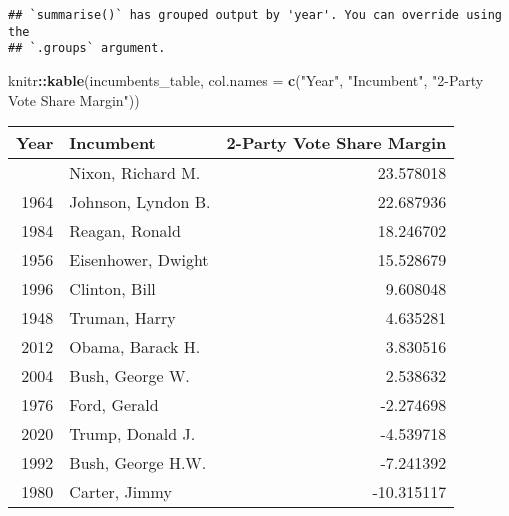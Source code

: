 \documentclass[
]{article}
\newenvironment{Shaded}{\begin{snugshade}}{\end{snugshade}}
\newcommand{\AttributeTok}[1]{\textcolor[rgb]{0.13,0.29,0.53}{#1}}
\newcommand{\FunctionTok}[1]{\textcolor[rgb]{0.13,0.29,0.53}{\textbf{#1}}}
\newcommand{\NormalTok}[1]{#1}
\newcommand{\SpecialCharTok}[1]{\textcolor[rgb]{0.81,0.36,0.00}{\textbf{#1}}}
\newcommand{\StringTok}[1]{\textcolor[rgb]{0.31,0.60,0.02}{#1}}
\begin{document}
\begin{verbatim}
## `summarise()` has grouped output by 'year'. You can override using the
## `.groups` argument.
\end{verbatim}

\begin{Shaded}
\begin{Highlighting}[]
\NormalTok{knitr}\SpecialCharTok{::}\FunctionTok{kable}\NormalTok{(incumbents\_table, }\AttributeTok{col.names =} \FunctionTok{c}\NormalTok{(}\StringTok{"Year"}\NormalTok{, }\StringTok{"Incumbent"}\NormalTok{, }\StringTok{"2{-}Party Vote Share Margin"}\NormalTok{))}
\end{Highlighting}
\end{Shaded}

\begin{longtable}[]{@{}rlr@{}}
\toprule\noalign{}
Year & Incumbent & 2-Party Vote Share Margin \\
\midrule\noalign{}
\endhead
\bottomrule\noalign{}
\endlastfoot
1972 & Nixon, Richard M. & 23.578018 \\
1964 & Johnson, Lyndon B. & 22.687936 \\
1984 & Reagan, Ronald & 18.246702 \\
1956 & Eisenhower, Dwight & 15.528679 \\
1996 & Clinton, Bill & 9.608048 \\
1948 & Truman, Harry & 4.635281 \\
2012 & Obama, Barack H. & 3.830516 \\
2004 & Bush, George W. & 2.538632 \\
1976 & Ford, Gerald & -2.274698 \\
2020 & Trump, Donald J. & -4.539718 \\
1992 & Bush, George H.W. & -7.241392 \\
1980 & Carter, Jimmy & -10.315117 \\
\end{longtable}
\end{document}

